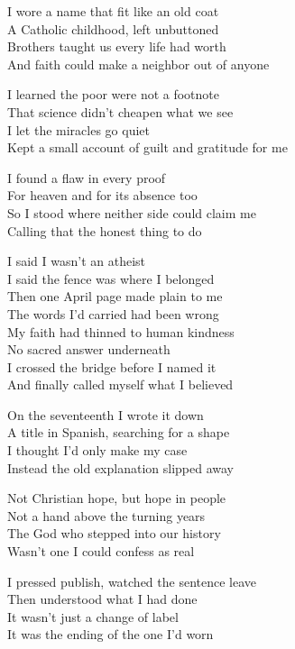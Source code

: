 \begin{lyrics}
I wore a name that fit like an old coat\\
A Catholic childhood, left unbuttoned\\
Brothers taught us every life had worth\\
And faith could make a neighbor out of anyone

I learned the poor were not a footnote\\
That science didn’t cheapen what we see\\
I let the miracles go quiet\\
Kept a small account of guilt and gratitude for me

I found a flaw in every proof\\
For heaven and for its absence too\\
So I stood where neither side could claim me\\
Calling that the honest thing to do

I said I wasn’t an atheist\\
I said the fence was where I belonged\\
Then one April page made plain to me\\
The words I’d carried had been wrong\\
My faith had thinned to human kindness\\
No sacred answer underneath\\
I crossed the bridge before I named it\\
And finally called myself what I believed

On the seventeenth I wrote it down\\
A title in Spanish, searching for a shape\\
I thought I’d only make my case\\
Instead the old explanation slipped away

Not Christian hope, but hope in people\\
Not a hand above the turning years\\
The God who stepped into our history\\
Wasn’t one I could confess as real

I pressed publish, watched the sentence leave\\
Then understood what I had done\\
It wasn’t just a change of label\\
It was the ending of the one I’d worn


\end{lyrics}

